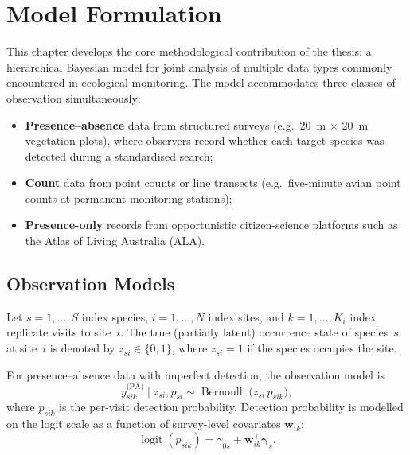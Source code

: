 \section{Model Formulation}

This chapter develops the core methodological contribution of the thesis: a
hierarchical Bayesian model for joint analysis of multiple data types commonly
encountered in ecological monitoring. The model accommodates three classes of
observation simultaneously:

\begin{itemize}[leftmargin=*,itemsep=4pt]
  \item \textbf{Presence--absence} data from structured surveys (e.g.\ 20~m
        $\times$ 20~m vegetation plots), where observers record whether each
        target species was detected during a standardised search;
  \item \textbf{Count} data from point counts or line transects (e.g.\
        five-minute avian point counts at permanent monitoring stations);
  \item \textbf{Presence-only} records from opportunistic citizen-science
        platforms such as the Atlas of Living Australia (ALA).
\end{itemize}

\subsection{Observation Models}

Let $s = 1,\dots,S$ index species, $i = 1,\dots,N$ index sites, and
$k = 1,\dots,K_i$ index replicate visits to site~$i$. The true
(partially latent) occurrence state of species~$s$ at site~$i$ is denoted by
$z_{si} \in \{0,1\}$, where $z_{si}=1$ if the species occupies the site.

For presence--absence data with imperfect detection, the observation model is
\begin{equation}\label{eq:detection}
  y_{sik}^{\text{(PA)}} \mid z_{si}, p_{si} \sim
  \operatorname{Bernoulli}\!\big(z_{si}\, p_{sik}\big),
\end{equation}
where $p_{sik}$ is the per-visit detection probability. Detection probability
is modelled on the logit scale as a function of survey-level covariates
$\mathbf{w}_{ik}$:
\begin{equation}
  \operatorname{logit}(p_{sik}) = \gamma_{0s} +
  \mathbf{w}_{ik}^\top \boldsymbol{\gamma}_s .
\end{equation}

